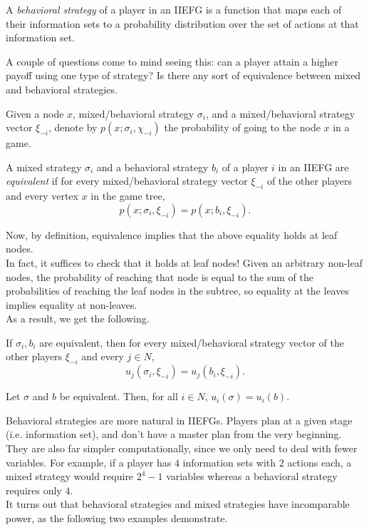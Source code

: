 		\begin{fdef}
			A \emph{behavioral strategy} of a player in an IIEFG is a function that maps each of their information sets to a probability distribution over the set of actions at that information set.
		\end{fdef}

		A couple of questions come to mind seeing this: can a player attain a higher payoff using one type of strategy? Is there any sort of equivalence between mixed and behavioral strategies.

		Given a node $x$, mixed/behavioral strategy $\sigma_i$, and a mixed/behavioral strategy vector $\xi_{-i}$, denote by $p(x;\sigma_i,\chi_{-i})$ the probability of going to the node $x$ in a game.
		\begin{fdef}
			A mixed strategy $\sigma_i$ and a behavioral strategy $b_i$ of a player $i$ in an IIEFG are \emph{equivalent} if for every mixed/behavioral strategy vector $\xi_{-i}$ of the other players and every vertex $x$ in the game tree,
			\[ p(x;\sigma_i,\xi_{-i}) = p(x;b_i,\xi_{-i}). \]
		\end{fdef}


		Now, by definition, equivalence implies that the above equality holds at leaf nodes.\\
		In fact, it suffices to check that it holds at leaf nodes! Given an arbitrary non-leaf nodes, the probability of reaching that node is equal to the sum of the probabilities of reaching the leaf nodes in the subtree, so equality at the leaves implies equality at non-leaves.\\
		As a result, we get the following.

		\begin{ftheo}
			If $\sigma_i,b_i$ are equivalent, then for every mixed/behavioral strategy vector of the other players $\xi_{-i}$ and every $j \in N$,
			\[ u_j(\sigma_i,\xi_{-i}) = u_j(b_i,\xi_{-i}). \]
		\end{ftheo}
		\begin{fcor}
			Let $\sigma$ and $b$ be equivalent. Then, for all $i \in N$, $u_i(\sigma) = u_i(b)$.
		\end{fcor}

		Behavioral strategies are more natural in IIEFGs. Players plan at a given stage (i.e. information set), and don't have a master plan from the very beginning. They are also far simpler computationally, since we only need to deal with fewer variables. For example, if a player has $4$ information sets with $2$ actions each, a mixed strategy would require $2^4-1$ variables whereas a behavioral strategy requires only $4$.\\
		It turns out that behavioral strategies and mixed strategies have incomparable power, as the following two examples demonstrate. 

